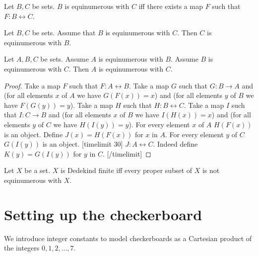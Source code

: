 \documentclass[english]{article}
\begin{document}
\begin{forthel}

\begin{definition}
    Let $B, C$ be sets.
    $B$ is equinumerous with $C$ iff there exists a map $F$ such that
    $F : B\leftrightarrow C$.
\end{definition}

\begin{lemma}
    Let $B, C$ be sets.
    Assume that $B$ is equinumerous with $C$.
    Then $C$ is equinumerous with $B$.
\end{lemma}

\begin{lemma}
    Let $A, B, C$ be sets.
    Assume $A$ is equinumerous with $B$.
    Assume $B$ is equinumerous with $C$.
    Then $A$ is equinumerous with $C$.
\end{lemma}
\begin{proof}
    Take a map $F$ such that $F : A\leftrightarrow B$.
    Take a map $G$ such that $G : B\rightarrow A$
    and (for all elements $x$ of $A$ we have $G(F(x)) = x$) and
    (for all elements $y$ of $B$ we have $F(G(y))=y$).
    Take a map $H$ such that $H : B\leftrightarrow C$.
    Take a map $I$ such that $I : C\rightarrow B$ and (for all elements $x$ of $B$ we have $I(H(x)) = x$) and
    (for all elements $y$ of $C$ we have $H(I(y))=y$).
    For every element $x$ of $A$ $H(F(x))$ is an object.
    Define $J(x) = H(F(x))$ for $x$ in $A$.
    For every element $y$ of $C$ $G(I(y))$ is an object.
[timelimit 30]
    $J : A\leftrightarrow C$. Indeed define $K(y) = G(I(y))$ for $y$ in $C$.
[/timelimit]
\end{proof}

\begin{definition}
    Let $X$ be a set.
    $X$ is Dedekind finite iff every proper subset of $X$
    is not equinumerous with $X$.
\end{definition}

\end{forthel}




\section{Setting up the checkerboard}

We introduce integer constants
to model checkerboards as a Cartesian product of the
integers $0, 1, 2, \ldots, 7$.
\end{document}
